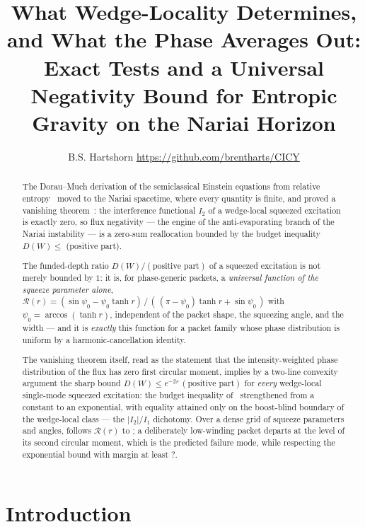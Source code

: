 \documentclass[11pt,a4paper]{article}
\title{\vspace{-1cm}\textbf{What Wedge-Locality Determines,\\
and What the Phase Averages Out:\\[2pt]
\large Exact Tests and a Universal Negativity Bound for Entropic Gravity
on the Nariai Horizon}}
\author{B.S. Hartshorn \orcidlink{0009-0004-2853-655X} \small
\url{https://github.com/brentharts/CICY}}
\newcommand{\NFBoundMarginMin}{?}\newcommand{\NFDevContour}{?}
\theoremstyle{plain}
\theoremstyle{definition}
\begin{document}
\maketitle

\begin{abstract}

The Dorau--Much derivation of the semiclassical Einstein equations from relative entropy~\cite{DorauMuch} 
moved to the Nariai spacetime, where every quantity is finite, and proved a vanishing
theorem~\cite{NariaiI}: the interference functional $I_2$ of a wedge-local squeezed
excitation is exactly zero, so flux negativity --- the engine of the
anti-evaporating branch of the Nariai instability --- is a zero-sum
reallocation bounded by the budget inequality $D(W) \le$ (positive part).

The funded-depth ratio $D(W)/(\text{positive part})$ of a squeezed excitation is not merely bounded
by $1$: it is, for phase-generic packets, a \emph{universal function of the squeeze parameter alone},
$\mathcal{R}(r) = (\sin\psi_0 - \psi_0\tanh r)\,/\,(\,(\pi-\psi_0)\tanh r +
\sin\psi_0\,)$ with $\psi_0 = \arccos(\tanh r)$, independent of the packet
shape, the squeezing angle, and the width --- and it is \emph{exactly} this
function for a packet family whose phase distribution is uniform by a
harmonic-cancellation identity.

The vanishing theorem itself, read as the statement that the intensity-weighted phase distribution 
of the flux has zero first circular moment, implies by a two-line convexity argument the sharp bound
$D(W) \le e^{-2r}\,(\text{positive part})$
for \emph{every} wedge-local single-mode squeezed excitation: the budget
inequality of~\cite{NariaiI} strengthened from a constant to an exponential,
with equality attained only on the boost-blind boundary of the wedge-local
class --- the $|I_2|/I_1$ dichotomy. Over a dense grid of \NFRGridN{} squeeze parameters and \NFThetaN{}
angles, follows $\mathcal{R}(r)$ to \NFDevGaussThree{}; a deliberately
low-winding packet departs at the level of its second circular moment,
which is the predicted failure mode, while respecting the exponential bound
with margin at least \NFBoundMarginMin{}.
\end{abstract}

\tableofcontents


\section{Introduction}
\label{sec:intro}
\end{document}

